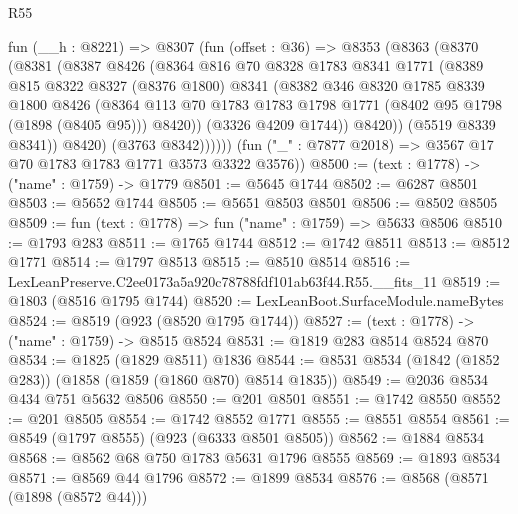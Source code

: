 \begin{lexlean}{R55}
\begin{coremodule}
          fun (__h : @8221) =>
          @8307
            (fun (offset : @36) =>
            @8353
              (@8363
                (@8370
                  (@8381
                    (@8387
                      @8426
                      (@8364
                        @816
                        @70
                        @8328
                        @1783
                        @8341
                        @1771
                        (@8389
                          @815
                          @8322
                          @8327
                          (@8376 @1800)
                          @8341
                          (@8382
                            @346
                            @8320
                            @1785
                            @8339
                            @1800
                            @8426
                            (@8364
                              @113
                              @70
                              @1783
                              @1783
                              @1798
                              @1771
                              (@8402 @95 @1798 (@1898 (@8405 @95)))
                              @8420))
                          (@3326 @4209 @1744))
                        @8420))
                    (@5519 @8339 @8341))
                  @8420)
                (@3763 @8342))))))
      (fun ("_" : @7877 @2018) => @3567 @17 @70 @1783 @1783 @1771 @3573 @3322 @3576))
@8500 := (text : @1778) -> ("name" : @1759) -> @1779
@8501 := @5645 @1744
@8502 := @6287 @8501
@8503 := @5652 @1744
@8505 := @5651 @8503 @8501
@8506 := @8502 @8505
@8509 := fun (text : @1778) => fun ("name" : @1759) => @5633 @8506
@8510 := @1793 @283
@8511 := @1765 @1744
@8512 := @1742 @8511
@8513 := @8512 @1771
@8514 := @1797 @8513
@8515 := @8510 @8514
@8516 := LexLeanPreserve.C2ee0173a5a920c78788fdf101ab63f44.R55.__fits_11
@8519 := @1803 (@8516 @1795 @1744)
@8520 := LexLeanBoot.SurfaceModule.nameBytes
@8524 := @8519 (@923 (@8520 @1795 @1744))
@8527 := (text : @1778) -> ("name" : @1759) -> @8515 @8524
@8531 := @1819 @283 @8514 @8524 @870
@8534 := @1825 (@1829 @8511) @1836
@8544 := @8531 @8534 (@1842 (@1852 @283)) (@1858 (@1859 (@1860 @870) @8514 @1835))
@8549 := @2036 @8534 @434 @751 @5632 @8506
@8550 := @201 @8501
@8551 := @1742 @8550
@8552 := @201 @8505
@8554 := @1742 @8552 @1771
@8555 := @8551 @8554
@8561 := @8549 (@1797 @8555) (@923 (@6333 @8501 @8505))
@8562 := @1884 @8534
@8568 := @8562 @68 @750 @1783 @5631 @1796 @8555
@8569 := @1893 @8534
@8571 := @8569 @44 @1796
@8572 := @1899 @8534
@8576 := @8568 (@8571 (@1898 (@8572 @44)))

\end{coremodule}
\end{lexlean}
